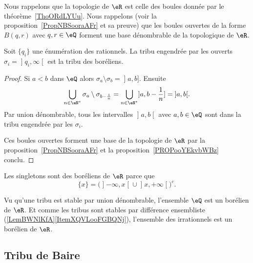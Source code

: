 Nous rappelons que la topologie de \( \eR\) est celle des boules donnée par le théorème~\ref{ThoORdLYUu}. Nous rappelons (voir la proposition~\ref{PropNBSooraAFr} et sa preuve) que les boules ouvertes de la forme \( B(q,r)\) avec \( q,r\in \eQ\) forment une base dénombrable de la topologique de \( \eR\).

\begin{lemma}   \label{LemZXnAbtl}
    Soit \( \{ q_i \}\) une énumération des rationnels. La tribu engendrée par les ouverts \( \sigma_i=\mathopen] q_i , \infty \mathclose[\) est la tribu des boréliens.
\end{lemma}

\begin{proof}
    Si \( a<b\) dans \( \eQ\) alors \( \sigma_a\setminus\sigma_b=\mathopen] a , b \mathclose]\). Ensuite
    \begin{equation}
        \bigcup_{n\in \eN^*}\sigma_a\setminus\sigma_{b-\frac{1}{ n }}=\bigcup_{n\in \eN^*}\mathopen] a , b-\frac{1}{ n } \mathclose]=\mathopen] a , b \mathclose[.
    \end{equation}
    Par union dénombrable, tous les intervalles \( \mathopen] a , b \mathclose[\) avec \( a,b\in \eQ\) sont dans la tribu engendrée par les \( \sigma_i\).

        Ces boules ouvertes forment une base de la topologie de \( \eR\) par la proposition~\ref{PropNBSooraAFr} et la proposition~\ref{PROPooYEkvbWBz} conclu.
\end{proof}

\begin{example}
    Les singletons sont des boréliens de \( \eR\) parce que
    \begin{equation}
    \{ x \}=\Big( \mathopen] -\infty , x \mathclose[\cup\mathopen] x , +\infty \mathclose[ \Big)^c.
    \end{equation}

    Vu qu'une tribu est stable par union dénombrable, l'ensemble \( \eQ\) est un borélien de \( \eR\). Et comme les tribus sont stables par différence ensembliste (\ref{LemBWNlKfA}\ref{ItemXQVLooFGBQNj}), l'ensemble des irrationnels est un borélien de \( \eR\).
\end{example}


\subsection{Tribu de Baire}

